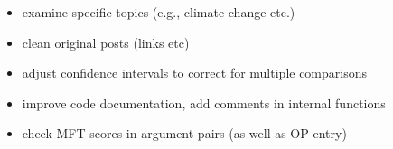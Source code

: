 \documentclass[12pt,]{article}
\providecommand{\tightlist}{%
\setlength{\itemsep}{0pt}\setlength{\parskip}{0pt}}
\begin{document}
\begin{itemize}
\tightlist
\item
  examine specific topics (e.g., climate change etc.)
\item
  clean original posts (links etc)
\item
  adjust confidence intervals to correct for multiple comparisons
\item
  improve code documentation, add comments in internal functions
\item
  check MFT scores in argument pairs (as well as OP entry)
\end{itemize}




\newpage
\singlespacing 

\end{document}
